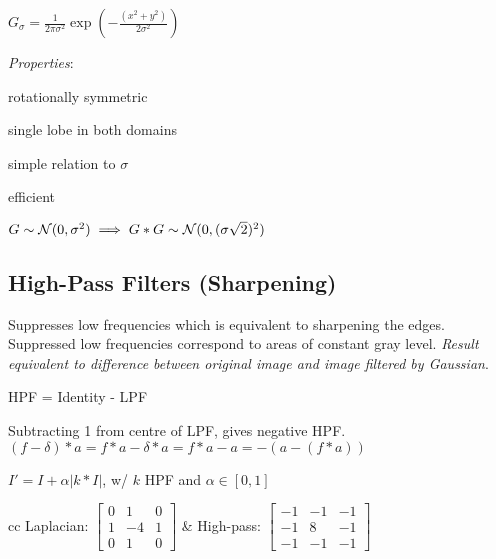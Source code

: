 \begin{definition}
  \(G_\sigma = \frac{1}{2 \pi \sigma^2} \exp\left(-\frac{(x^2 + y^2)}{2\sigma^2}\right)\)

  \textit{Properties}:
  \begin{itemize*}
    \item rotationally symmetric
    \item single lobe in both domains
    \item simple relation to \(\sigma\)
    \item efficient
  \end{itemize*}
\end{definition}

\begin{theorem}
  \(G \sim \operatorname{\mathcal{N}}(0, \sigma^2) \implies G \ast G \sim \operatorname{\mathcal{N}}(0, (\sigma \sqrt{2})^2)\)
\end{theorem}

\subsection{High-Pass Filters (Sharpening)}
Suppresses low frequencies which is equivalent to sharpening the edges. Suppressed low frequencies correspond to areas of constant gray level. \textit{Result equivalent to difference between original image and image filtered by Gaussian}.

\begin{definition}[Construction]
  HPF = Identity - LPF
\end{definition}

\begin{theorem}
  Subtracting 1 from centre of LPF, gives negative HPF.
  \((f - \delta) \ast a = f \ast a - \delta \ast a = f \ast a - a = -(a - (f \ast a))\)
\end{theorem}

\begin{definition}
  \(I' = I + \alpha |k \ast I|\), w/ \(k\) HPF and \(\alpha \in [0, 1]\)
\end{definition}

\begin{tabularx}{\linewidth}{cc}
  Laplacian: \(\begin{bmatrix}
    0 & 1 & 0 \\
    1 & -4 & 1 \\
    0 & 1 & 0
  \end{bmatrix}\) & 
  High-pass: \(\begin{bmatrix}
    -1 & -1 & -1 \\
    -1 & 8 & -1 \\
    -1 & -1 & -1
  \end{bmatrix}\)
\end{tabularx}

